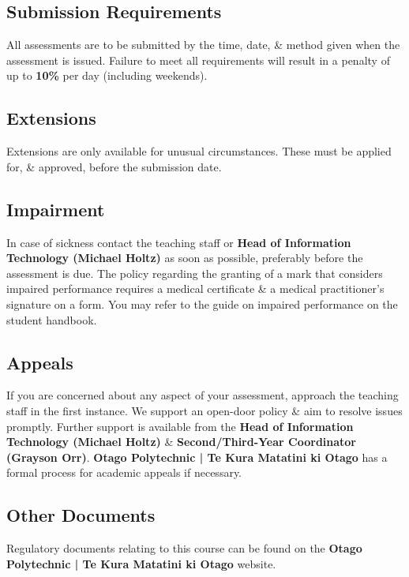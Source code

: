 \documentclass{article}
\begin{document}
\subsection*{Submission Requirements}
All assessments are to be submitted by the time, date, \& method given when the assessment is issued. Failure to meet all requirements will result in a penalty of up to \textbf{10\%} per day (including weekends).

\subsection*{Extensions}
Extensions are only available for unusual circumstances. These must be applied for, \& approved, before the submission date.

\subsection*{Impairment}
In case of sickness contact the teaching staff or \textbf{Head of Information Technology (Michael Holtz)} as soon as possible, preferably before the assessment is due. The policy regarding the granting of a mark that considers impaired performance requires a medical certificate \& a medical practitioner's signature on a form. You may refer to the guide on impaired performance on the student handbook.

\subsection*{Appeals}
If you are concerned about any aspect of your assessment, approach the teaching staff in the first instance. We support an open-door policy \& aim to resolve issues promptly. Further support is available from the \textbf{Head of Information Technology (Michael Holtz)} \& \textbf{Second/Third-Year Coordinator (Grayson Orr)}. \textbf{Otago Polytechnic | Te Kura Matatini ki Otago} has a formal process for academic appeals if necessary.

\subsection*{Other Documents}
Regulatory documents relating to this course can be found on the \textbf{Otago Polytechnic | Te Kura Matatini ki Otago} website.
\end{document}
